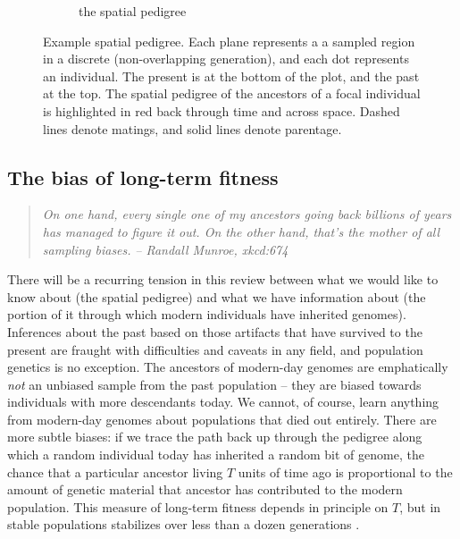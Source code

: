 \documentclass{ar-1col}
\newcommand{\g}[1]{{\color{blue}{#1}}}
\newcommand{\plr}[1]{{\color{green}{#1}}}
\begin{document}
\begin{figure}[ht]
\begin{subfigure}{0.5\textwidth}
        \caption{the spatial pedigree}
        \label{sp_pedigree}
    \end{subfigure}
        \caption{
            Example spatial pedigree.
                    Each plane represents a a sampled region in a discrete (non-overlapping generation),
                    and each dot represents an individual.
                    The present is at the bottom of the plot, and the past at the top.
                    The spatial pedigree of the ancestors of a focal individual is highlighted in red
                    back through time and across space.
                    Dashed lines denote matings, and solid lines denote parentage.
        }
        \label{spatial_pedigree}
\end{figure}

\subsection{The bias of long-term fitness}


\begin{quote}
    \textit{
    On one hand, every single one of my ancestors going back billions of years
    has managed to figure it out.
    On the other hand, that's the mother of all sampling biases.}
    \hfill \textit{-- Randall Munroe, xkcd:674}
\end{quote}

There will be a recurring tension in this review
between what we would like to know about (the spatial pedigree)
and what we have information about 
(the portion of it through which modern individuals have inherited genomes).
Inferences about the past
based on those artifacts that have survived to the present
are fraught with difficulties and caveats in any field, 
and population genetics is no exception.
The ancestors of modern-day genomes are emphatically \textit{not} an unbiased sample
from the past population -- 
they are biased towards individuals with more descendants today.
We cannot, of course, learn anything from modern-day genomes
about populations that died out entirely.
There are more subtle biases:
if we trace the path back up through the pedigree 
along which a random individual today has inherited a random bit of genome,
the chance that a particular ancestor living $T$ units of time ago 
\g{missing phrase?}
is proportional to the amount of genetic material that ancestor has contributed to the modern population.
This measure of long-term fitness depends in principle on $T$,
but in stable populations stabilizes over less than a dozen generations \citep{BartonEtheridge2011fitness} \plr{check that!}.
\end{document}
